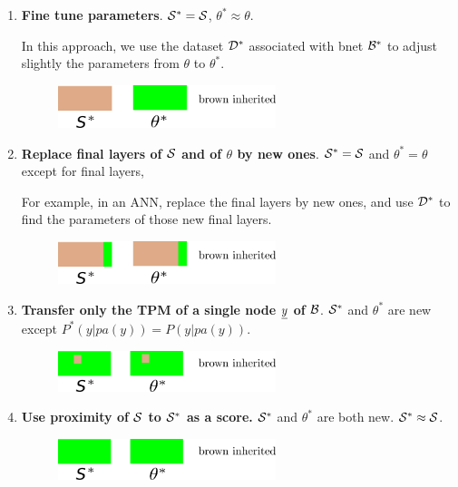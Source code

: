 \begin{enumerate}
\item {\bf Fine tune parameters}.
${\cal S}^*={\cal S}$, $\theta^*\approx \theta$.

In this approach, we use the dataset ${\cal D}^*$ associated 
with bnet ${\cal B}^*$ to 
adjust slightly the parameters from $\theta$
to $\theta^*$.

\begin{figure}[h!]
\centering
\includegraphics[width=2.5in]
{transfer/fine-tune-params.png}
\end{figure}


\item {\bf Replace final layers of ${\cal S}$
and of $\theta$ by new ones}.
${\cal S}^*={\cal S}$ and 
$\theta^*=\theta$ except for final  layers,

For example, in an ANN,
replace the final layers by new ones,
and use ${\cal D}^*$ to 
find the parameters of those
new final layers.

\begin{figure}[h!]
\centering
\includegraphics[width=2.5in]
{transfer/last-layer-new.png}
\end{figure}


\item {\bf Transfer only
the  TPM of a single node $\rvy$ of ${\cal B}$}.
${\cal S}^*$ and $\theta^*$ are new
except $P^*(y|pa(y))=P(y|pa(y))$.

\begin{figure}[h!]
\centering
\includegraphics[width=2.5in]
{transfer/one-tpm.png}
\end{figure}

\item {\bf Use proximity of ${\cal S}$ to ${\cal S}^*$
as a score.}
${\cal S}^*$ and $\theta^*$ are both new. 
${\cal S}^*\approx{\cal S}$.


\begin{figure}[h!]
\centering
\includegraphics[width=2.5in]
{transfer/all-green.png}
\end{figure}

\end{enumerate}







